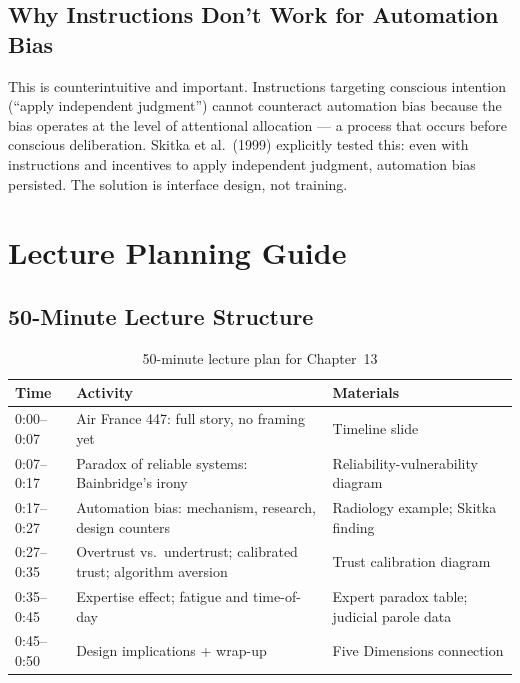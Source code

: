 \subsection{Why Instructions Don't Work for Automation Bias}

This is counterintuitive and important. Instructions targeting conscious intention (``apply independent judgment'') cannot counteract automation bias because the bias operates at the level of attentional allocation --- a process that occurs before conscious deliberation. Skitka et al.\ (1999) explicitly tested this: even with instructions and incentives to apply independent judgment, automation bias persisted. The solution is interface design, not training.

\section{Lecture Planning Guide}

\subsection{50-Minute Lecture Structure}

\begin{table}[htbp]
\caption{50-minute lecture plan for Chapter~13}
\label{tab:lecture-plan-ch13}
\centering
\begin{tabular}{@{}p{2.5cm}p{6cm}p{3.5cm}@{}}
\toprule
\textbf{Time} & \textbf{Activity} & \textbf{Materials} \\
\midrule
0:00--0:07 & Air France 447: full story, no framing yet & Timeline slide \\
0:07--0:17 & Paradox of reliable systems: Bainbridge's irony & Reliability-vulnerability diagram \\
0:17--0:27 & Automation bias: mechanism, research, design counters & Radiology example; Skitka finding \\
0:27--0:35 & Overtrust vs.\ undertrust; calibrated trust; algorithm aversion & Trust calibration diagram \\
0:35--0:45 & Expertise effect; fatigue and time-of-day & Expert paradox table; judicial parole data \\
0:45--0:50 & Design implications + wrap-up & Five Dimensions connection \\
\bottomrule
\end{tabular}
\end{table}

